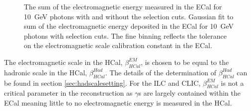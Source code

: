 \begin{figure}[h!]
\caption[\protect{} The sum of the electromagnetic energy measured in the ECal for 10~GeV photons with and without the selection cuts.  \protect{} Gaussian fit to sum of the electromagnetic energy deposited in the ECal for 10~GeV photons with selection cuts.  The fine binning reflects the tolerance on the electromagnetic scale calibration constant in the ECal.]{\protect{} The sum of the electromagnetic energy measured in the ECal for 10~GeV photons with and without the selection cuts.  \protect{} Gaussian fit to sum of the electromagnetic energy deposited in the ECal for 10~GeV photons with selection cuts.  The fine binning reflects the tolerance on the electromagnetic scale calibration constant in the ECal.}
\label{fig:ecalemscale}
\end{figure}
 
The electromagnetic scale in the HCal, $\beta^{EM}_{HCal}$, is chosen to be equal to the hadronic scale in the HCal, $\beta^{Had}_{HCal}$.  The details of the determination of $\beta^{Had}_{HCal}$ can be found in section \ref{sec:hadscalesetting}.  For the ILC and CLIC, $\beta^{EM}_{HCal}$ is not a critical parameter in the reconstruction as $\gamma$s are largely contained within the ECal meaning little to no electromagnetic energy is measured in the HCal.  

